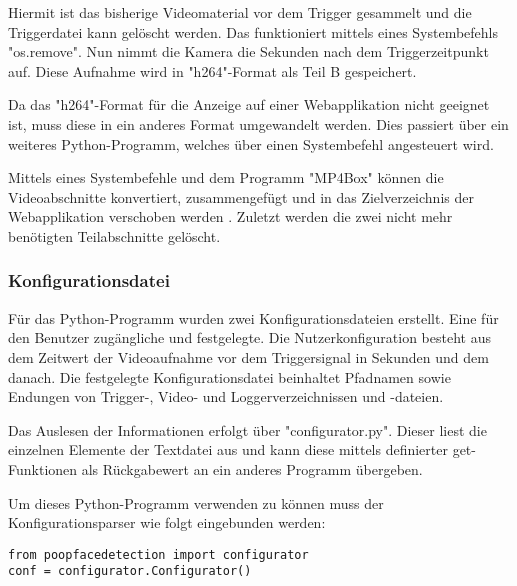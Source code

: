 Hiermit ist das bisherige Videomaterial vor dem Trigger gesammelt und die Triggerdatei kann gelöscht werden. Das funktioniert mittels eines Systembefehls "os.remove". Nun nimmt die Kamera die Sekunden nach dem Triggerzeitpunkt auf. Diese Aufnahme wird in "h264"-Format als Teil B gespeichert.

Da das "h264"-Format für die Anzeige auf einer Webapplikation nicht geeignet ist, muss diese in ein anderes Format umgewandelt werden. Dies passiert über ein weiteres Python-Programm, welches über einen Systembefehl angesteuert wird.

Mittels eines Systembefehle und dem Programm "MP4Box" können die Videoabschnitte konvertiert, zusammengefügt und in das Zielverzeichnis der Webapplikation verschoben werden . Zuletzt werden die zwei nicht mehr benötigten Teilabschnitte gelöscht.

\subsubsection{Konfigurationsdatei}

Für das Python-Programm wurden zwei Konfigurationsdateien erstellt. Eine für den Benutzer zugängliche und festgelegte.
Die Nutzerkonfiguration besteht aus dem Zeitwert der Videoaufnahme vor dem Triggersignal in Sekunden und dem danach.
Die festgelegte Konfigurationsdatei beinhaltet Pfadnamen sowie Endungen von Trigger-, Video- und Loggerverzeichnissen und -dateien.

Das Auslesen der Informationen erfolgt über "configurator.py". Dieser liest die einzelnen Elemente der Textdatei aus und kann diese mittels definierter get-Funktionen als Rückgabewert an ein anderes Programm übergeben.

Um dieses Python-Programm verwenden zu können muss der Konfigurationsparser wie folgt eingebunden werden:

\begin{lstlisting}
from poopfacedetection import configurator
conf = configurator.Configurator()
\end{lstlisting}